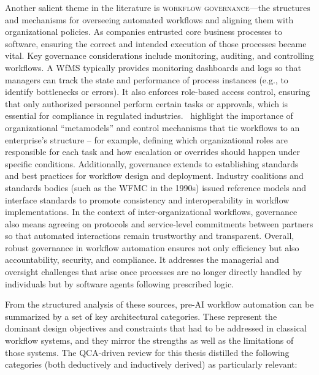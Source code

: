 Another salient theme in the literature is \textsc{workflow governance}---the structures and mechanisms for overseeing automated workflows and aligning them with organizational policies. As companies entrusted core business processes to software, ensuring the correct and intended execution of those processes became vital. Key governance considerations include monitoring, auditing, and controlling workflows. A WfMS typically provides monitoring dashboards and logs so that managers can track the state and performance of process instances (e.g., to identify bottlenecks or errors). It also enforces role-based access control, ensuring that only authorized personnel perform certain tasks or approvals, which is essential for compliance in regulated industries.~\textcite{basuResearch2002} highlight the importance of organizational “metamodels” and control mechanisms that tie workflows to an enterprise’s structure – for example, defining which organizational roles are responsible for each task and how escalation or overrides should happen under specific conditions. Additionally, governance extends to establishing standards and best practices for workflow design and deployment. Industry coalitions and standards bodies (such as the WFMC in the 1990s) issued reference models and interface standards to promote consistency and interoperability in workflow implementations. In the context of inter-organizational workflows, governance also means agreeing on protocols and service-level commitments between partners so that automated interactions remain trustworthy and transparent. Overall, robust governance in workflow automation ensures not only efficiency but also accountability, security, and compliance. It addresses the managerial and oversight challenges that arise once processes are no longer directly handled by individuals but by software agents following prescribed logic.

From the structured analysis of these sources, pre-AI workflow automation can be summarized by a set of key architectural categories. These represent the dominant design objectives and constraints that had to be addressed in classical workflow systems, and they mirror the strengths as well as the limitations of those systems. The QCA-driven review for this thesis distilled the following categories (both deductively and inductively derived) as particularly relevant:


